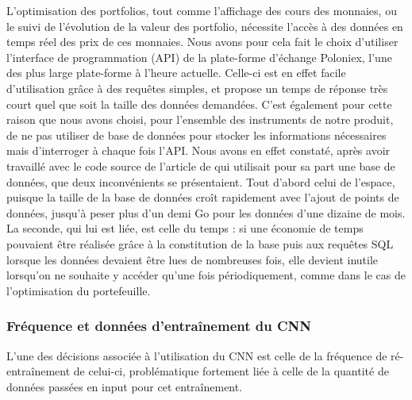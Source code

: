 \documentclass[a4paper, 10pt]{article}
\begin{document}
L'optimisation des portfolios, tout comme l'affichage des cours des monnaies, ou le suivi de l'évolution de la valeur des portfolio, nécessite l'accès à des données en temps réel des prix de ces monnaies. Nous avons pour cela fait le choix d'utiliser l'interface de programmation (API) de la plate-forme d'échange Poloniex, l'une des plus large plate-forme à l'heure actuelle. Celle-ci est en effet facile d'utilisation grâce à des requêtes simples, et propose un temps de réponse très court quel que soit la taille des données demandées. C'est également pour cette raison que nous avons choisi, pour l'ensemble des instruments de notre produit, de ne pas utiliser de base de données pour stocker les informations nécessaires mais d'interroger à chaque fois l'API. Nous avons en effet constaté, après avoir travaillé avec le code source de l'article de \citet{Jiang2017} qui utilisait pour sa part une base de données, que deux inconvénients se présentaient. Tout d'abord celui de l'espace, puisque la taille de la base de données croît rapidement avec l'ajout de points de données, jusqu'à peser plus d'un demi Go pour les données d'une dizaine de mois. La seconde, qui lui est liée, est celle du temps : si une économie de temps pouvaient être réalisée grâce à la constitution de la base puis aux requêtes SQL lorsque les données devaient être lues de nombreuses fois, elle devient inutile lorsqu'on ne souhaite y accéder qu'une fois périodiquement, comme dans le cas de l'optimisation du portefeuille.

\subsubsection{Fréquence et données d'entraînement du CNN}
\label{sec:developpement_choix_train}

L'une des décisions associée à l'utilisation du CNN est celle de la fréquence de ré-entraînement de celui-ci, problématique fortement liée à celle de la quantité de données passées en input pour cet entraînement. 
\end{document}
